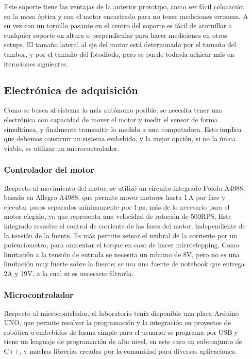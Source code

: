 Este soporte tiene las ventajas de la anterior prototipo, como ser fácil colocación en la mesa óptica y con el motor encastrado para no tener mediciones erroneas. A su vez con un tornillo pasante en el centro del soporte es fácil de atornillar a cualquier soporte en altura o perpendicular para hacer mediciones en otros setups. El tamaño lateral al eje del motor está determinado por el tamaño del tambor, y por el tamaño del fotodiodo, pero se puede todavía achicar más en iteraciones siguientes.

\subsection{Electrónica de adquisición}

Como se busca al sistema lo más autónomo posible,  se necesita tener una electrónica con capacidad de mover el motor y medir el sensor de forma simultánea, y finalmente transmitir lo medido a una computadora. Esto implica que debemos construir un sistema embebido, y la mejor opción, si no la única viable, es utilizar un microcontrolador. 

\subsubsection{Controlador del motor}
Respecto al movimiento del motor, se utilizó un circuito integrado Pololu A4988\cite{pololu}, basado en Allegro A4988, que permite mover motores hasta 1$\,$A por fase y ejecutar pasos separados mínimamente por 1$\,\mu$s, más de lo necesario para el motor elegido, ya que representa una velocidad de rotación de 500RPS. Este integrado resuelve el control de corriente de las fases del motor, independiente de la tensión de la fuente. Es más permite setear el umbral de la corriente por un potenciometro, para aumentar el torque en caso de hacer microstepping. Como limitación a la tensión de entrada se necesita un mínimo de 8V, pero no es una limitación muy fuerte sobre la fuente; se usa una fuente de notebook que entrega 2A y 19V, a la cual ni es necesario filtrarla.

\subsubsection{Microcontrolador}
Respecto al microcontrlador, el laboratorio tenía disponible una placa Arduino\cite{arduino} UNO, que permite resolver la programación y la integración en proyectos de robótica o embebidos de forma simple para el usuario; se programa por USB y tiene un lenguaje de programación de alto nivel, en este caso un subconjunto de C++, y muchas librerías creadas por la comunidad para diversas aplicaciones.

